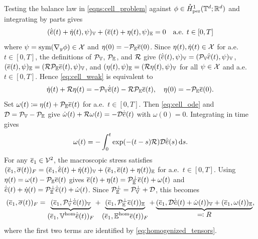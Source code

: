 Testing the balance law in \cref{eqns:cell_problem} against $\phi\in\mathring{H}^1_{\mathrm{per}}(\mathbb{T}^d;\mathbb{R}^d)$ and integrating by parts gives
\begin{equation}\label{eq:cell_weak}
(\dot{\overline{e}}(t)+\dot\eta(t),\psi)_{\mathbb{V}}+(\overline{e}(t)+\eta(t),\psi)_{\mathbb{E}}=0\quad \text{a.e. }t\in{[0,T]}
\end{equation}
where $\psi=\mathrm{sym}(\nabla_y\phi)\in{\mathcal{X}}$ and $\eta(0)=-{\mathcal{P}}_{\mathbb{E}}\overline{e}(0)$. Since $\eta(t),\dot\eta(t)\in{\mathcal{X}}$ for a.e.\ $t\in{[0,T]}$, the definitions of ${\mathcal{P}}_{\mathbb{V}}$, ${\mathcal{P}}_{\mathbb{E}}$, and ${\mathcal{R}}$ give $(\dot{\overline{e}}(t),\psi)_{\mathbb{V}}=({\mathcal{P}}_{\mathbb{V}}\dot{\overline{e}}(t),\psi)_{\mathbb{V}}$, $(\overline{e}(t),\psi)_{\mathbb{E}}=({\mathcal{R}}{\mathcal{P}}_{\mathbb{E}}\overline{e}(t),\psi)_{\mathbb{V}}$, and $(\eta(t),\psi)_{\mathbb{E}}=({\mathcal{R}}\eta(t),\psi)_{\mathbb{V}}$ for all $\psi\in{\mathcal{X}}$ and a.e.\ $t\in{[0,T]}$. Hence \cref{eq:cell_weak} is equivalent to
\begin{equation}\label{eq:cell_ode}
\dot\eta(t)+{\mathcal{R}}\eta(t)=-{\mathcal{P}}_{\mathbb{V}}\dot{\overline{e}}(t)-{\mathcal{R}}{\mathcal{P}}_{\mathbb{E}}\overline{e}(t),\quad\eta(0)=-{\mathcal{P}}_{\mathbb{E}}\overline{e}(0).
\end{equation}
Set $\omega(t)\coloneqq\eta(t)+{\mathcal{P}}_{\mathbb{E}}\overline{e}(t)$ for a.e.\ $t\in{[0,T]}$. Then \cref{eq:cell_ode} and ${\mathcal{D}}={\mathcal{P}}_{\mathbb{V}}-{\mathcal{P}}_{\mathbb{E}}$ give $\dot\omega(t)+{\mathcal{R}}\omega(t)=-{\mathcal{D}}\dot{\overline{e}}(t)$ with $\omega(0)=0$. Integrating in time gives
\begin{equation}\label{eq:eta_sol}
\omega(t)=-\int_0^t\exp(-(t-s){\mathcal{R}}){\mathcal{D}}\dot{\overline{e}}(s)\,\mathrm{d}s.
\end{equation}
For any $\overline{e}_1\in{\mathcal{V}}^2$, the macroscopic stress satisfies $(\overline{e}_1, \overline{\sigma}(t))_F=(\overline{e}_1,\dot{\overline{e}}(t)+\dot\eta(t))_{\mathbb{V}}+(\overline{e}_1,\overline{e}(t)+\eta(t))_{\mathbb{E}}$ for a.e.\ $t\in{[0,T]}$. Using $\eta(t)=\omega(t)-{\mathcal{P}}_{\mathbb{E}}\overline{e}(t)$ gives $\overline{e}(t)+\eta(t)={\mathcal{P}}_{\mathbb{E}}^{\perp}\overline{e}(t)+\omega(t)$ and $\dot{\overline{e}}(t)+\dot\eta(t)={\mathcal{P}}_{\mathbb{E}}^{\perp}\dot{\overline{e}}(t)+\dot\omega(t)$. Since ${\mathcal{P}}_{\mathbb{E}}^{\perp}={\mathcal{P}}_{\mathbb{V}}^{\perp}+{\mathcal{D}}$, this becomes
\begin{equation}\label{eq:stress_decomp}
(\overline{e}_1, \overline{\sigma}(t))_{F}
=\underbrace{(\overline{e}_1,{\mathcal{P}}_{\mathbb{V}}^{\perp}\dot{\overline{e}}(t))_{\mathbb{V}}}_{\displaystyle (\overline{e}_1, \mathbb{V}^{\mathrm{hom}}\dot{\overline{e}}(t))_F}
+\underbrace{(\overline{e}_1,{\mathcal{P}}_{\mathbb{E}}^{\perp}\overline{e}(t))_{\mathbb{E}}}_{\displaystyle(\overline{e}_1,\mathbb{E}^{\mathrm{hom}}\overline{e}(t))_F}
+\underbrace{(\overline{e}_1,{\mathcal{D}}\dot{\overline{e}}(t)+\dot\omega(t))_{\mathbb{V}}+(\overline{e}_1,\omega(t))_{\mathbb{E}}}_{\displaystyle\eqqcolon R},
\end{equation}
where the first two terms are identified by \cref{eq:homogenized_tensors}.

